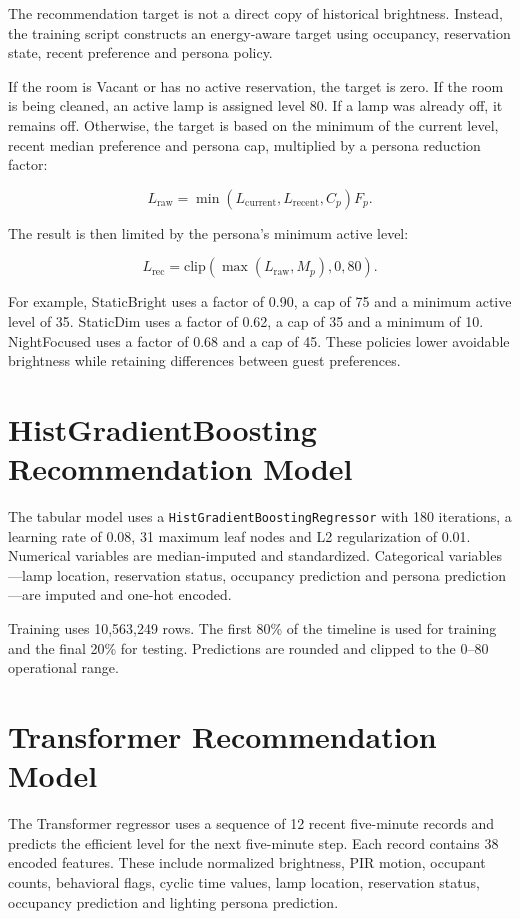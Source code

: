 The recommendation target is not a direct copy of historical brightness.
Instead, the training script constructs an energy-aware target using occupancy,
reservation state, recent preference and persona policy.

If the room is Vacant or has no active reservation, the target is zero. If the
room is being cleaned, an active lamp is assigned level 80. If a lamp was
already off, it remains off. Otherwise, the target is based on the minimum of
the current level, recent median preference and persona cap, multiplied by a
persona reduction factor:

\[
    L_{\mathrm{raw}} =
    \min(L_{\mathrm{current}},L_{\mathrm{recent}},C_p)F_p.
\]

The result is then limited by the persona's minimum active level:

\[
    L_{\mathrm{rec}} =
    \mathrm{clip}\left(
    \max(L_{\mathrm{raw}},M_p),0,80\right).
\]

For example, StaticBright uses a factor of 0.90, a cap of 75 and a minimum
active level of 35. StaticDim uses a factor of 0.62, a cap of 35 and a minimum
of 10. NightFocused uses a factor of 0.68 and a cap of 45. These policies lower
avoidable brightness while retaining differences between guest preferences.

\section{HistGradientBoosting Recommendation Model}

The tabular model uses a \texttt{HistGradientBoostingRegressor} with 180
iterations, a learning rate of 0.08, 31 maximum leaf nodes and L2
regularization of 0.01. Numerical variables are median-imputed and standardized.
Categorical variables---lamp location, reservation status, occupancy prediction
and persona prediction---are imputed and one-hot encoded.

Training uses 10,563,249 rows. The first 80\% of the timeline is used for
training and the final 20\% for testing. Predictions are rounded and clipped
to the 0--80 operational range.

\section{Transformer Recommendation Model}

The Transformer regressor uses a sequence of 12 recent five-minute records and
predicts the efficient level for the next five-minute step. Each record
contains 38 encoded features. These include normalized brightness, PIR motion,
occupant counts, behavioral flags, cyclic time values, lamp location,
reservation status, occupancy prediction and lighting persona prediction.

